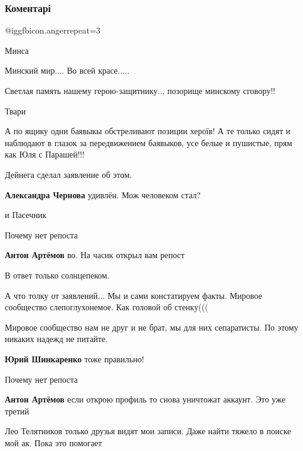  
 
 
 
 
\subsubsection{Коментарі}

\begin{itemize} %
 @igg{fbicon.anger}{repeat=3} 

Минса

Минский мир.... Во всей красе.....

Светлая память нашему герою-защитнику.., позорище минскому сговору!!

Твари


А по ящику одни баявыкы обстреливают позиции хероїв! А те только сидят и
наблюдают в глазок за передвижением баявыков, усе белые и пушистые, прям как Юля
с Парашей!!!

Дейнега сделал заявление об этом.

\begin{itemize} %
\textbf{Александра Чернова} удивлён. Мож человеком стал?

и Пасечник

Почему нет репоста

\textbf{Антон Артёмов} во. На часик открыл вам репост
\end{itemize} %

В ответ только солнцепеком.

А что толку от заявлений... Мы и сами констатируем факты. Мировое сообщество слепоглухонемое. Как головой об стенку(((

Мировое сообщество нам не друг и не брат, мы для них сепаратисты. По этому никаких надежд не питайте.

\textbf{Юрий Шинкаренко} тоже правильно!

Почему нет репоста

\textbf{Антон Артёмов} если открою профиль то снова уничтожат аккаунт. Это уже третий


Лео Телятников только друзья видят мои записи. Даже найти тяжело в поиске мой ак.
Пока это помогает

\end{itemize} %
